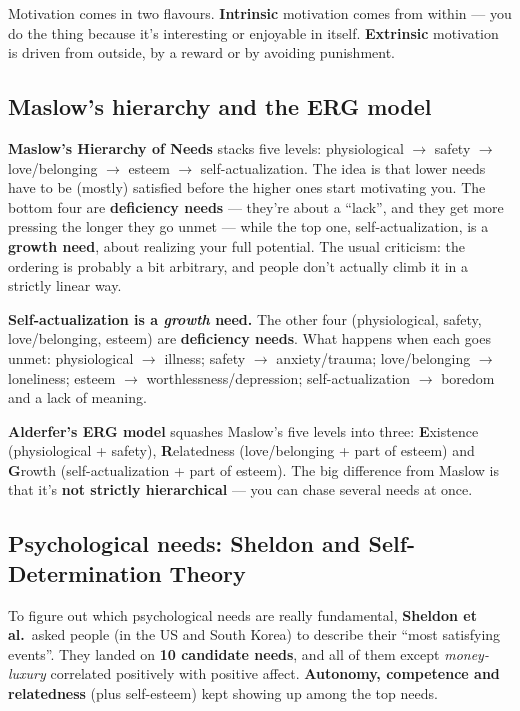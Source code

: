 \documentclass[11pt, oneside]{book}
\begin{document}
Motivation comes in two flavours. \textbf{Intrinsic} motivation comes from
within — you do the thing because it's interesting or enjoyable in itself.
\textbf{Extrinsic} motivation is driven from outside, by a reward or by
avoiding punishment.

\subsection{Maslow's hierarchy and the ERG model}

\textbf{Maslow's Hierarchy of Needs} stacks five levels: physiological $\to$
safety $\to$ love/belonging $\to$ esteem $\to$ self-actualization. The idea is
that lower needs have to be (mostly) satisfied before the higher ones start
motivating you. The bottom four are \textbf{deficiency needs} — they're about
a ``lack'', and they get more pressing the longer they go unmet — while the
top one, self-actualization, is a \textbf{growth need}, about realizing your
full potential. The usual criticism: the ordering is probably a bit
arbitrary, and people don't actually climb it in a strictly linear way.

\begin{notebox}[title={Fill-in trap (straight from the sample exam)}]
\textbf{Self-actualization is a \emph{growth} need.} The other four
(physiological, safety, love/belonging, esteem) are \textbf{deficiency
needs}. What happens when each goes unmet: physiological $\to$ illness;
safety $\to$ anxiety/trauma; love/belonging $\to$ loneliness; esteem $\to$
worthlessness/depression; self-actualization $\to$ boredom and a lack of
meaning.
\end{notebox}

\textbf{Alderfer's ERG model} squashes Maslow's five levels into three:
\textbf{E}xistence (physiological + safety), \textbf{R}elatedness
(love/belonging + part of esteem) and \textbf{G}rowth (self-actualization +
part of esteem). The big difference from Maslow is that it's \textbf{not
strictly hierarchical} — you can chase several needs at once.

\subsection{Psychological needs: Sheldon and Self-Determination Theory}

To figure out which psychological needs are really fundamental,
\textbf{Sheldon et al.}\ asked people (in the US and South Korea) to describe
their ``most satisfying events''. They landed on \textbf{10 candidate needs},
and all of them except \emph{money-luxury} correlated positively with
positive affect. \textbf{Autonomy, competence and relatedness} (plus
self-esteem) kept showing up among the top needs.
\end{document}

